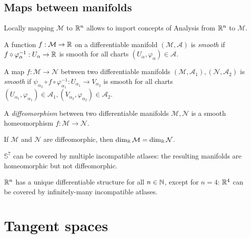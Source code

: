 \subsection{Maps between manifolds}

Locally mapping $ \mathcal{M} $ to $ \mathbb{R}^n $ allows to import concepts of Analysis from $ \mathbb{R}^n $ to $ \mathcal{M} $.

\begin{definition}
  A function $ f : \mathcal{M} \rightarrow \mathbb{R} $ on a differentiable manifold $ (\mathcal{M},\mathcal{A}) $ is \textit{smooth} if $ f \circ \varphi_{\alpha}^{-1} : U_{\alpha} \rightarrow \mathbb{R} $ is smooth for all charts $ (U_{\alpha},\varphi_{\alpha}) \in \mathcal{A} $.
\end{definition}

\begin{definition}
  A map $ f : \mathcal{M} \rightarrow \mathcal{N} $ between two differentiable manifolds $ (\mathcal{M},\mathcal{A}_1), (\mathcal{N},\mathcal{A}_2) $ is \textit{smooth} if $ \psi_{\alpha_2} \circ f \circ \varphi_{\alpha_1}^{-1} : U_{\alpha_1} \rightarrow V_{\alpha_2} $ is smooth for all charts $ (U_{\alpha_1},\varphi_{\alpha_1}) \in \mathcal{A}_1, (V_{\alpha_2},\varphi_{\alpha_2}) \in \mathcal{A}_2 $.
\end{definition}

\begin{definition}
  A \textit{diffeomorphism} between two differentiable manifolds $ \mathcal{M},\mathcal{N} $ is a smooth homeomorphism $ f : \mathcal{M} \rightarrow \mathcal{N} $.
\end{definition}

\begin{proposition}
  If $ \mathcal{M} $ and $ \mathcal{N} $ are diffeomorphic, then $ \dim_{\mathbb{R}}\mathcal{M} = \dim_{\mathbb{R}}\mathcal{N} $.
\end{proposition}

\begin{example}
  $ \mathbb{S}^7 $ can be covered by multiple incompatible atlases: the resulting manifolds are homeomorphic but not diffeomorphic.
\end{example}

\begin{example}
  $ \mathbb{R}^n $ has a unique differentiable structure for all $ n \in \mathbb{N} $, except for $ n = 4 $: $ \mathbb{R}^4 $ can be covered by infinitely-many incompatible atlases.
\end{example}

\section{Tangent spaces}

